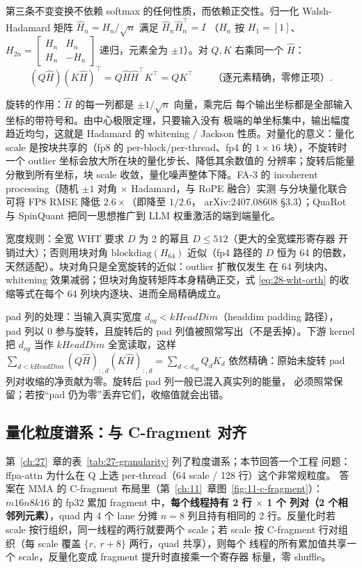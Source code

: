 第三条不变变换不依赖 softmax 的任何性质，而依赖正交性。归一化
Walsh-Hadamard 矩阵 $\hat H_n = H_n/\sqrt{n}$ 满足 $\hat H_n \hat H_n^{\top} = I$
（$H_n$ 按 $H_1=[1]$、$H_{2n} = \left[\begin{smallmatrix} H_n & H_n \\ H_n &
-H_n\end{smallmatrix}\right]$ 递归，元素全为 $\pm1$）。对 $Q,K$ 右乘同一个
$\hat H$：
\begin{equation}
  (Q\hat H)(K\hat H)^{\top} = Q \hat H \hat H^{\top} K^{\top} = Q K^{\top}
  \qquad\text{（逐元素精确，零修正项）}.
  \label{eq:28-wht-orth}
\end{equation}

旋转的作用：$\hat H$ 的每一列都是 $\pm1/\sqrt{n}$ 向量，乘完后
每个输出坐标都是全部输入坐标的带符号和。由中心极限定理，只要输入没有
极端的单坐标集中，输出幅度趋近均匀，这就是 Hadamard 的 whitening / Jackson
性质。对量化的意义：量化 scale 是按块共享的（fp8 的 per-block/per-thread、fp4 的
$1\times16$ 块），不旋转时一个 outlier 坐标会放大所在块的量化步长、降低其余数值的
分辨率；旋转后能量分散到所有坐标，块 scale 收敛，量化噪声整体下降。FA-3 的
incoherent processing（随机 $\pm1$ 对角 $\times$ Hadamard，与 RoPE 融合）实测
与分块量化联合可将 FP8 RMSE 降低 $2.6\times$（即降至 $1/2.6$，
arXiv:2407.08608 \S3.3）；QuaRot 与
SpinQuant 把同一思想推广到 LLM 权重激活的端到端量化。

宽度规则：全宽 WHT 要求 $D$ 为 2 的幂且 $D\le 512$（更大的全宽蝶形寄存器
开销过大）；否则用块对角 $\mathrm{blockdiag}(H_{64})$ 近似（fp4 路径的
$D$ 恒为 64 的倍数，天然适配）。块对角只是全宽旋转的近似：outlier 扩散仅发生
在 64 列块内、whitening 效果减弱；但块对角旋转矩阵本身精确正交，式
\ref{eq:28-wht-orth} 的收缩等式在每个 64 列块内逐块、进而全局精确成立。

pad 列的处理：当输入真实宽度 $d_{og} < kHeadDim$（headdim padding 路径），
pad 列以 0 参与旋转，且旋转后的 pad 列值被照常写出（不是丢掉）。下游
kernel 把 $d_{og}$ 当作 $kHeadDim$ 全宽读取，这样
$\sum_{d<kHeadDim} (Q\hat H)_{:,d}(K\hat H)_{:,d} = \sum_{d<d_{og}} Q_d K_d$
依然精确：原始未旋转 pad 列对收缩的净贡献为零。旋转后 pad 列一般已混入真实列的能量，
必须照常保留；若按“pad 仍为零”丢弃它们，收缩值就会出错。

\subsection{量化粒度谱系：与 C-fragment 对齐}\label{sec:28-granularity}

第~\ref{ch:27}~章的表~\ref{tab:27-granularity} 列了粒度谱系；本节回答一个工程
问题：ffpa-attn 为什么在 Q 上选 per-thread（64 scale / 128 行）这个非常规粒度。
答案在 MMA 的 C-fragment 布局里（第~\ref{ch:11}~章图~\ref{fig:11-c-fragment}）：
$m16n8k16$ 的 fp32 累加 fragment 中，\textbf{每个线程持有 2 行 $\times$ 1 个
列对（2 个相邻列元素）}，quad 内 4 个 lane 分摊 $n{=}8$ 列且持有相同的
2 行。反量化时若 scale 按行组织，同一线程的两行就要两个 scale；若 scale 按
C-fragment 行对组织（每 scale 覆盖 $\{r,\ r+8\}$ 两行，quad 共享），则每个
线程的所有累加值共享一个 scale，反量化变成 fragment 提升时直接乘一个寄存器
标量，零 shuffle。

